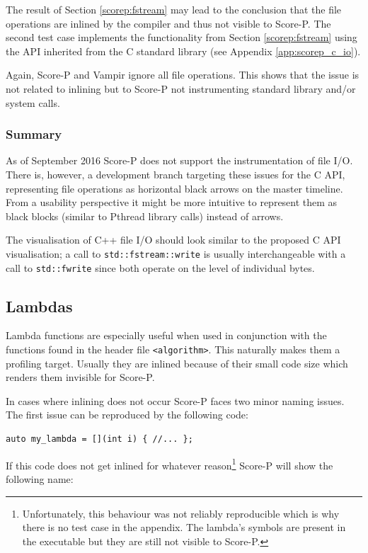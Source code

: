 The result of Section \ref{scorep:fstream} may lead to the conclusion that the file operations are inlined by the compiler and thus not visible to Score-P. The second test case implements the functionality from Section \ref{scorep:fstream} using the API inherited from the C standard library (see Appendix \ref{app:scorep_c_io}).

Again, Score-P and Vampir ignore all file operations. This shows that the issue is not related to inlining but to Score-P not instrumenting standard library and/or system calls.

\subsubsection{Summary}

As of September 2016 Score-P does not support the instrumentation of file I/O. There is, however, a development branch targeting these issues for the C API, representing file operations as horizontal black arrows on the master timeline. From a usability perspective it might be more intuitive to represent them as black blocks (similar to Pthread library calls) instead of arrows.

The visualisation of C++ file I/O should look similar to the proposed C API visualisation; a call to \texttt{std::fstream::write} is usually interchangeable with a call to \texttt{std::fwrite} since both operate on the level of individual bytes.

\subsection{Lambdas}

Lambda functions are especially useful when used in conjunction with the functions found in the header file \texttt{<algorithm>}. This naturally makes them a profiling target. Usually they are inlined because of their small code size which renders them invisible for Score-P.

In cases where inlining does not occur Score-P faces two minor naming issues. The first issue can be reproduced by the following code:

\begin{verbatim}
auto my_lambda = [](int i) { //... };
\end{verbatim}

\noindent If this code does not get inlined for whatever reason\footnote{Unfortunately, this behaviour was not reliably reproducible which is why there is no test case in the appendix. The lambda's symbols are present in the executable but they are still not visible to Score-P.} Score-P will show the following name:

